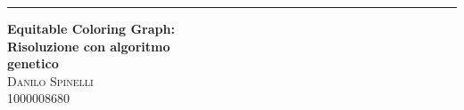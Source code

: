 \documentclass[12pt]{article}
\begin{document}
	
	\raggedleft %
	
	\rule{1pt}{\textheight} %
	\hspace{0.05\textwidth} %
	\parbox[b]{0.75\textwidth}{ %
		
		{\Huge\bfseries Equitable Coloring Graph: \\[0.2\baselineskip] Risoluzione con algoritmo \\genetico}\\[3\baselineskip] %
		{\Large\textsc{Danilo Spinelli}\\[0.5\baselineskip]} %
		{\Large\textsc{1000008680}}
		
		\vspace{0.4\textheight} %
	}
\end{document}
